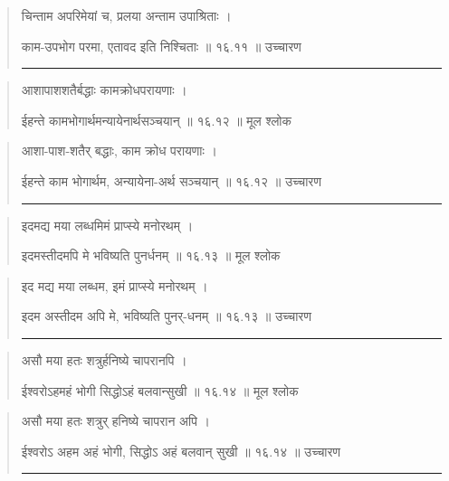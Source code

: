 \begin{quotation}

चिन्ताम अपरिमेयां च, प्रलया अन्ताम उपाश्रिताः ।  

काम-उपभोग परमा, एतावद इति निश्चिताः  ॥ १६.११ ॥  उच्चारण

\noindent\rule{16cm}{0.4pt} 
\end{quotation}


\begin{quotation}
आशापाशशतैर्बद्धाः कामक्रोधपरायणाः ।  

ईहन्ते कामभोगार्थमन्यायेनार्थसञ्चयान्‌  ॥ १६.१२ ॥  मूल श्लोक
\end{quotation}

\begin{quotation}

आशा-पाश-शतैर् बद्धाः, काम क्रोध परायणाः ।  

ईहन्ते काम भोगार्थम, अन्यायेना-अर्थ सञ्चयान्‌  ॥ १६.१२ ॥  उच्चारण

\noindent\rule{16cm}{0.4pt} 
\end{quotation}


\begin{quotation}

इदमद्य मया लब्धमिमं प्राप्स्ये मनोरथम्‌ ।  

इदमस्तीदमपि मे भविष्यति पुनर्धनम्‌  ॥ १६.१३ ॥  मूल श्लोक
\end{quotation}

\begin{quotation}

इद मद्य मया लब्धम, इमं प्राप्स्ये मनोरथम्‌ ।  

इदम अस्तीदम अपि मे, भविष्यति पुनर्-धनम्‌  ॥ १६.१३ ॥  उच्चारण

\noindent\rule{16cm}{0.4pt} 
\end{quotation}


\begin{quotation}

असौ मया हतः शत्रुर्हनिष्ये चापरानपि ।  

ईश्वरोऽहमहं भोगी सिद्धोऽहं बलवान्सुखी  ॥ १६.१४ ॥  मूल श्लोक
\end{quotation}

\begin{quotation}

असौ मया हतः शत्रुर् हनिष्ये चापरान अपि ।  

ईश्वरोऽ अहम अहं भोगी, सिद्धोऽ अहं बलवान् सुखी  ॥ १६.१४ ॥  उच्चारण

\noindent\rule{16cm}{0.4pt} 
\end{quotation}


